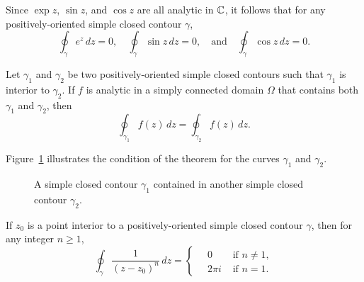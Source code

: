 \begin{example}
    Since \(\exp z\), \(\sin z\), and \(\cos z\) are all analytic in \(\mathbb{C}\), it follows that for any positively-oriented simple closed contour \(\gamma\),
    \[
        \oint_\gamma e^z \, dz = 0, \quad \oint_\gamma \sin z \, dz = 0, \quad \text{and} \quad \oint_\gamma \cos z \, dz = 0.
    \]
\end{example}

\begin{theorem}
    Let \(\gamma_1\) and \(\gamma_2\) be two positively-oriented simple closed contours such that \(\gamma_1\) is interior to \(\gamma_2\). If \(f\) is analytic in a simply connected domain \(\Omega\) that contains both \(\gamma_1\) and \(\gamma_2\), then
    \[
        \oint_{\gamma_1} f(z) \, dz = \oint_{\gamma_2} f(z) \, dz.
    \]
\end{theorem}

Figure~\ref{fig:deformation-of-contours} illustrates the condition of the theorem for the curves \(\gamma_1\) and \(\gamma_2\).


\begin{figure}
    \label{fig:deformation-of-contours}
    \caption{A simple closed contour \(\gamma_1\) contained in another simple closed contour \(\gamma_2\).}
\end{figure}

\begin{theorem}
    If \(z_0\) is a point interior to a positively-oriented simple closed contour \(\gamma\), then for any integer \(n \geq 1\),
    \[
        \oint_\gamma \frac{1}{(z - z_0)^n} \, dz = \begin{cases}
            \quad 0 & \text{ if } n \neq 1,\\
            \quad 2\pi i & \text{ if } n = 1.
        \end{cases}
    \]
\end{theorem}


